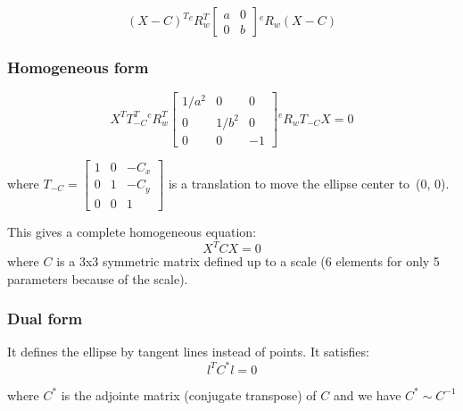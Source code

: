 \begin{equation}
(X - C)^T {}^{e}R_{w}^T \left[ \begin{array}{cc}
    a & 0 \\
    0 & b
\end{array}
\right] {}^{e}R_{w} (X - C)
\end{equation}




\subsubsection{Homogeneous form}
\begin{equation}
    X^T T_{-C}^T
    {}^{e}R_{w}^T
    \left[ \begin{array}{ccc}
    1/a^2 & 0 & 0\\
    0 & 1/b^2 & 0\\
    0 & 0 & -1
    \end{array}\right]
    {}^{e}R_{w}
    T_{-C}
    X = 0
\end{equation}

where $T_{-C} = \left[\begin{array}{ccc}
    1&0&-C_x \\
    0&1&-C_y \\
    0&0&1
    \end{array}\right]$ is a translation to move the ellipse center to~(0, 0).

This gives a complete homogeneous equation:
\begin{equation}
    X^T C X = 0
\end{equation}
where $C$ is a 3x3 symmetric matrix defined up to a scale (6 elements for only 5 parameters because of the scale).

\subsubsection{Dual form}
It defines the ellipse by tangent lines instead of points. It satisfies:
\begin{equation}
    l^T C^* l = 0
\end{equation}

where $C^*$ is the adjointe matrix (conjugate transpose) of $C$ and we have $C^* \sim C^{-1}$

